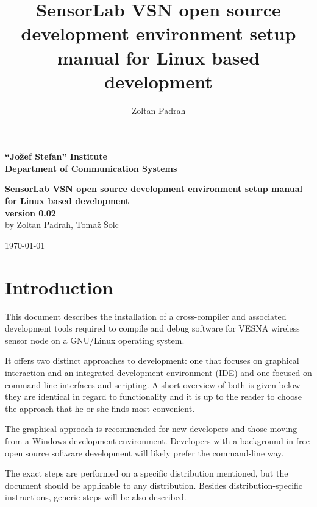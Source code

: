 \documentclass[a4paper, 10pt]{article}
\title{SensorLab VSN open source development environment setup manual for Linux based development}
\author{Zoltan Padrah}
\begin{document}
\begin{titlepage}
    \begin{center}
    \textbf{\Large ``Jožef Stefan'' Institute \\[2mm]
        Department of Communication Systems}\\
        
    \vfill

    \textbf{\huge SensorLab VSN open source development environment setup manual 
        for Linux based development}\\[1.5cm]
        
    
    \textbf{ \Large
    version 0.02}\\[1cm]
    
    \textnormal{\Large
    by Zoltan Padrah, Tomaž Šolc}\\[1cm]
    
    \vfill
    
    \textnormal{\large
    \today\\[1cm]
    }
    \end{center}
\end{titlepage}


\section{Introduction}

This document describes the installation of a cross-compiler and associated
development tools required to compile and debug software for VESNA wireless
sensor node on a GNU/Linux operating system.

It offers two distinct approaches to development: one that focuses on graphical
interaction and an integrated development environment (IDE) and one focused on
command-line interfaces and scripting. A short overview of both is given below
- they are identical in regard to functionality and it is up to the reader to
choose the approach that he or she finds most convenient.

The graphical approach is recommended for new developers and those moving from a
Windows development environment. Developers with a background in free open
source software development will likely prefer the command-line way.

The exact steps are performed on a specific distribution mentioned, but the
document should be applicable to any distribution. Besides distribution-specific
instructions, generic steps will be also described.
\end{document}
